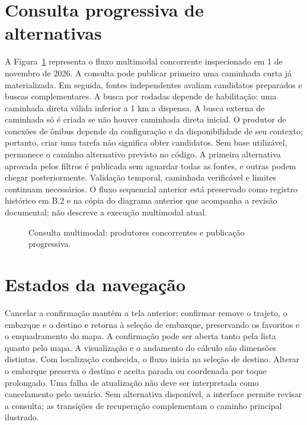 \documentclass[12pt,oneside,a4paper,brazil,chapter=TITLE]{abntex2}
\let\papsection\section
\renewcommand{\section}{\clearpage\papsection}
\begin{document}
\begin{apendicesenv}
\section{Consulta progressiva de alternativas}
A Figura~\ref{fig:sequencia-pap} representa o fluxo multimodal concorrente inspecionado em 1 de novembro de 2026. A consulta pode publicar primeiro uma caminhada curta já materializada. Em seguida, fontes independentes avaliam candidatos preparados e buscas complementares. A busca por rodadas depende de habilitação: uma caminhada direta válida inferior a 1 km a dispensa. A busca externa de caminhada só é criada se não houver caminhada direta inicial. O produtor de conexões de ônibus depende da configuração e da disponibilidade de seu contexto; portanto, criar uma tarefa não significa obter candidatos. Sem base utilizável, permanece o caminho alternativo previsto no código. A primeira alternativa aprovada pelos filtros é publicada sem aguardar todas as fontes, e outras podem chegar posteriormente. Validação temporal, caminhada verificável e limites continuam necessários. O fluxo sequencial anterior está preservado como registro histórico em B.2 e na cópia do diagrama anterior que acompanha a revisão documental; não descreve a execução multimodal atual.

\begin{figure}[H]
\centering
\caption{Consulta multimodal: produtores concorrentes e publicação progressiva.}\label{fig:sequencia-pap}
\end{figure}

\section{Estados da navegação}
Cancelar a confirmação mantém a tela anterior; confirmar remove o trajeto, o embarque e o destino e retorna à seleção de embarque, preservando os favoritos e o enquadramento do mapa. A confirmação pode ser aberta tanto pela lista quanto pelo mapa. A visualização e o andamento do cálculo são dimensões distintas. Com localização conhecida, o fluxo inicia na seleção de destino. Alterar o embarque preserva o destino e aceita parada ou coordenada por toque prolongado. Uma falha de atualização não deve ser interpretada como cancelamento pelo usuário. Sem alternativa disponível, a interface permite revisar a consulta; as transições de recuperação complementam o caminho principal ilustrado.


\end{apendicesenv}
\end{document}
